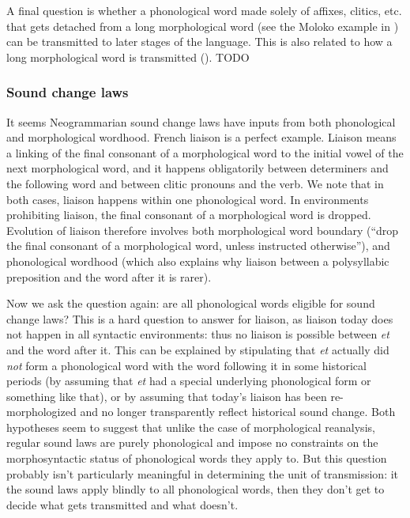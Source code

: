 \documentclass[a4paper, oneside, scheme=plain, 12pt]{article}
\newcommand{\form}[1]{\emph{#1}}
\begin{document}
A final question is whether a phonological word made solely of affixes, clitics, etc.
that gets detached from a long morphological word
(see the Moloko example in )
can be transmitted to later stages of the language.
This is also related to how a long morphological word is transmitted
(). TODO

\subsubsection{Sound change laws}\label{sec:sound-change-law}

It seems Neogrammarian sound change laws have inputs from both phonological and morphological wordhood.
French liaison is a perfect example.
Liaison means a linking of the final consonant of a morphological word to the initial vowel of the next morphological word,
and it happens obligatorily between determiners and the following word
and between clitic pronouns and the verb.
We note that in both cases, liaison happens within one phonological word.
In environments prohibiting liaison, the final consonant of a morphological word is dropped.
Evolution of liaison therefore involves both morphological word boundary
(``drop the final consonant of a morphological word, unless instructed otherwise''),
and phonological wordhood (which also explains why liaison between a polysyllabic preposition and the word after it is rarer).

Now we ask the question again: are all phonological words eligible for sound change laws?
This is a hard question to answer for liaison,
as liaison today does not happen in all syntactic environments:
thus no liaison is possible between \form{et} and the word after it.
This can be explained by stipulating that \form{et} actually did \emph{not} form a phonological word with the word following it
in some historical periods (by assuming that \form{et} had a special underlying phonological form or something like that),
or by assuming that today's liaison has been re-morphologized and no longer transparently reflect historical sound change.
Both hypotheses seem to suggest that unlike the case of morphological reanalysis,
regular sound laws are purely phonological and impose no constraints on the morphosyntactic status of phonological words they apply to.
But this question probably isn't particularly meaningful in determining the unit of transmission:
it the sound laws apply blindly to all phonological words,
then they don't get to decide what gets transmitted and what doesn't.
\end{document}
